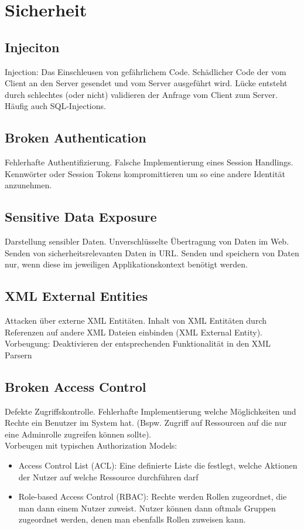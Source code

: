 \documentclass[12pt,a4paper]{article}
\begin{document}
\section{Sicherheit}
\subsection{Injeciton}
Injection: Das Einschleusen von gefährlichem Code. Schädlicher Code der vom Client an den Server gesendet und vom Server ausgeführt wird. Lücke entsteht durch schlechtes (oder nicht) validieren der Anfrage vom Client zum Server. Häufig auch SQL-Injections.

\subsection{Broken Authentication}
Fehlerhafte Authentifizierung. Falsche Implementierung eines Session Handlings. Kennwörter oder Session Tokens kompromittieren um so eine andere Identität anzunehmen.

\subsection{Sensitive Data Exposure}
Darstellung sensibler Daten. Unverschlüsselte Übertragung von Daten im Web. Senden von sicherheitsrelevanten Daten in URL. Senden und speichern von Daten nur, wenn diese im jeweiligen Applikationskontext benötigt werden. 

\subsection{XML External Entities}
Attacken über externe XML Entitäten. Inhalt von XML Entitäten durch Referenzen auf andere XML Dateien einbinden (XML External Entity). Vorbeugung: Deaktivieren der entsprechenden Funktionalität in den XML Parsern

\subsection{Broken Access Control}
Defekte Zugriffskontrolle. Fehlerhafte Implementierung welche Möglichkeiten und Rechte ein Benutzer im System hat. (Bspw. Zugriff auf Ressourcen auf die nur eine Adminrolle zugreifen können sollte).\\
Vorbeugen mit typischen Authorization Models:\\
\begin{itemize}
	\item Access Control List (ACL): Eine definierte Liste die festlegt, welche Aktionen der Nutzer auf welche Ressource durchführen darf
	\item Role-based Access Control (RBAC): Rechte werden Rollen zugeordnet, die man dann einem Nutzer zuweist. Nutzer können dann oftmals Gruppen zugeordnet werden, denen man ebenfalls Rollen zuweisen kann.
\end{itemize}
\end{document}
